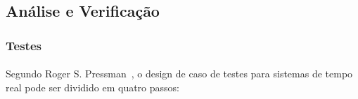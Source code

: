 %

\subsection{Análise e Verificação}
\subsubsection{Testes}
\paragraph{}
Segundo Roger S. Pressman~\cite{pre_2005}, o design de caso de testes para sistemas de tempo real pode ser dividido
em quatro passos:

